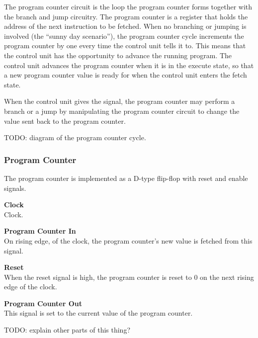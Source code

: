 The program counter circuit is the loop the program counter forms together with the branch and jump circuitry.
The program counter is a register that holds the address of the next instruction to be fetched.
When no branching or jumping is involved (the ``sunny day scenario''), the program counter cycle increments the program counter by one every time the control unit tells it to.
This means that the control unit has the opportunity to advance the running program.
The control unit advances the program counter when it is in the execute state, so that a new program counter value is ready for when the control unit enters the fetch state.

When the control unit gives the signal, the program counter may perform a branch or a jump by manipulating the program counter circuit to change the value sent back to the program counter.

TODO: diagram of the program counter cycle.

\subsubsection{Program Counter}

The program counter is implemented as a D-type flip-flop with reset and enable signals.


\begin{description}
\item{\textbf{Clock}} \\

Clock.

\item{\textbf{Program Counter In}} \\

On rising edge, of the clock, the program counter's new value is fetched from this signal.

\item{\textbf{Reset}} \\

When the reset signal is high, the program counter is reset to 0 on the next rising edge of the clock.

\end{description}


\begin{description}
\item{\textbf{Program Counter Out}} \\

This signal is set to the current value of the program counter.

\end{description}

TODO: explain other parts of this thing?
